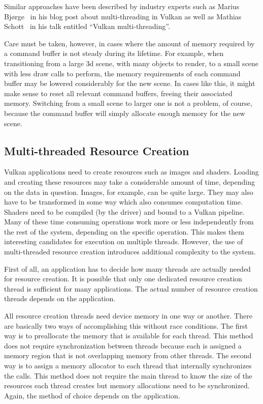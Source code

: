         Similar approaches have been described by industry experts such as Marius Bjørge~\cite{bjorge:multithreadingvulkan} in his blog post about multi-threading in Vulkan as well as Mathias Schott~\cite{mschott:vulkan_multi_threading} in his talk entitled ``Vulkan multi-threading''.

        Care must be taken, however, in cases where the amount of memory required by a command buffer is not steady during its lifetime.
        For example, when transitioning from a large \gls{3d} scene, with many objects to render, to a small scene with less draw calls to perform, the memory requirements of each command buffer may be lowered considerably for the new scene.
        In cases like this, it might make sense to reset all relevant command buffers, freeing their associated memory.
        Switching from a small scene to larger one is not a problem, of course, because the command buffer will simply allocate enough memory for the new scene.


    \subsection{Multi-threaded Resource Creation}
      Vulkan applications need to create resources such as images and shaders.
      Loading and creating these resources may take a considerable amount of time, depending on the data in question.
      Images, for example, can be quite large.
      They may also have to be transformed in some way which also consumes computation time.
      Shaders need to be compiled (by the \gls{driver}) and bound to a Vulkan pipeline.
      Many of these time consuming operations work more or less independently from the rest of the system, depending on the specific operation.
      This makes them interesting candidates for execution on multiple threads.
      However, the use of multi-threaded resource creation introduces additional complexity to the system.

      First of all, an application has to decide how many threads are actually needed for resource creation.
      It is possible that only one dedicated resource creation thread is sufficient for many applications.
      The actual number of resource creation threads depends on the application.

      All resource creation threads need device memory in one way or another.
      There are basically two ways of accomplishing this without race conditions.
      The first way is to preallocate the memory that is available for each thread.
      This method does not require synchronization between threads because each is assigned a memory region that is not overlapping memory from other threads.
      The second way is to assign a memory allocator to each thread that internally synchronizes the calls.
      This method does not require the main thread to know the size of the resources each thread creates but memory allocations need to be synchronized.
      Again, the method of choice depends on the application.
